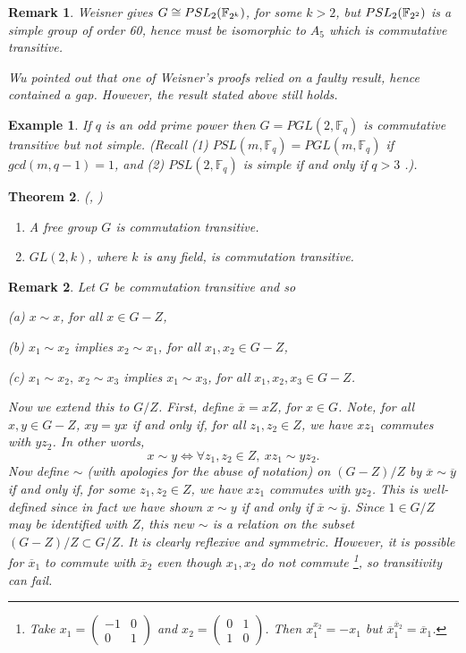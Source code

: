 \documentclass[amsfonts,12pt]{article}
\newtheorem{theorem}{Theorem}
\newtheorem{example}[theorem]{Example}
\newtheorem{remark}{Remark}
\def\fff{\mathbb{F}}
\begin{document}
\begin{remark} Weisner \cite{W} gives 
$G\cong PSL_2({\Bbb{F}}_{2^k})$, for some $k> 2$,
but $PSL_2({\Bbb{F}}_{2^2})$ is a simple group of order 60, 
hence must be isomorphic to $A_5$ which is
commutative transitive. 

Wu \cite{Wu} pointed out that
one of Weisner's proofs relied on a faulty result,
hence contained a gap. However, the result stated 
above still holds.
\end{remark}

\begin{example}
If $q$ is an odd prime power then $G=PGL(2,\fff_q)$ is
commutative transitive but not simple. (Recall
(1) $PSL(m,\fff_q)=PGL(m,\fff_q)$ if $gcd(m,q-1)=1$,
and (2) $PSL(2,\fff_q)$ is simple if and only if 
$q>3$ \cite{R}.).
\end{example}

\begin{theorem} (\cite{F}, \cite{LR}) 

\begin{enumerate}
\item
A free group $G$ is commutation transitive.
\item
$GL(2,k)$, where $k$ is any field, is commutation transitive.
\end{enumerate}
\end{theorem}

\begin{remark}
Let $G$ be commutation transitive and so

(a) $x\sim x$, for all $x\in G-Z$,

(b) $x_1\sim x_2$ implies $ x_2\sim x_1$, for all $x_1,x_2\in G-Z$,

(c) $x_1\sim x_2,\ x_2\sim x_3$ implies $x_1\sim x_3$, for all 
$x_1,x_2,x_3\in G-Z$.

\noindent
Now we extend this to $G/Z$. First,
define $\overline{x}=xZ$, for $x\in G$.
Note, for all $x,y\in G-Z$,
$xy=yx$ if and only if, for all $z_1,z_2\in Z$, we have
$xz_1$ commutes with $yz_2$. In other words,
\[
x\sim y \iff \forall z_1,z_2\in Z,\ xz_1\sim yz_2.
\]
Now define $\sim $ (with apologies for the abuse of
notation) on $(G-Z)/Z$ by
$\overline{x}\sim \overline{y}$ if and only if, 
for {\it some} $z_1,z_2\in Z$, we have
$xz_1$ commutes with $yz_2$.
This is well-defined since in fact we have shown
$x\sim y$ if and only if $\overline{x}\sim \overline{y}$.
Since $1\in G/Z$ may be identified with $Z$, 
this new $\sim$ is a relation on the 
subset $(G-Z)/Z\subset G/Z$.
It is clearly reflexive and symmetric. However, it
is possible for $\overline{x}_1$ to commute with 
$\overline{x}_2$ even
though $x_1, x_2$ do not commute
\footnote{Take 
$x_1=\left(\begin{array}{cc}-1 & 0\\ 0 & 1\end{array}
\right) $ and $x_2=\left(\begin{array}{cc}0 & 1\\ 1 & 0\end{array}
\right) $. Then $x_1^{x_2}=-x_1$ but
$\overline{x}_1^{\overline{x}_2}=\overline{x}_1$.},
so transitivity can fail.
\end{remark}
\end{document}
